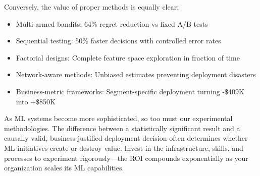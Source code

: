 Conversely, the value of proper methods is equally clear:
\begin{itemize}
    \item Multi-armed bandits: 64\% regret reduction vs fixed A/B tests
    \item Sequential testing: 50\% faster decisions with controlled error rates
    \item Factorial designs: Complete feature space exploration in fraction of time
    \item Network-aware methods: Unbiased estimates preventing deployment disasters
    \item Business-metric frameworks: Segment-specific deployment turning -\$409K into +\$850K
\end{itemize}

As ML systems become more sophisticated, so too must our experimental methodologies. The difference between a statistically significant result and a causally valid, business-justified deployment decision often determines whether ML initiatives create or destroy value. Invest in the infrastructure, skills, and processes to experiment rigorously---the ROI compounds exponentially as your organization scales its ML capabilities.
